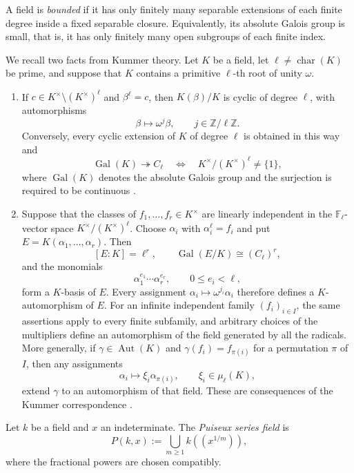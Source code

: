 \documentclass[10pt,a4paper]{amsart}
\renewcommand{\le}{\leqslant}
\renewcommand{\ge}{\geqslant}
\theoremstyle{definition}
\begin{document}
A field is \emph{bounded} if it has only finitely many
separable extensions of each finite degree inside a fixed
separable closure. Equivalently, its absolute Galois group
is small, that is, it has only finitely many open subgroups
of each finite index.

We recall two facts from Kummer theory. Let $K$ be a field,
let $\ell\ne\operatorname{char}(K)$ be prime, and suppose
that $K$ contains a primitive $\ell$-th root of unity $\omega$.

\begin{enumerate}[label=\textup{(\roman*)}]
\item
If $c\in K^\times\setminus(K^\times)^\ell$ and $\beta^\ell=c$,
then $K(\beta)/K$ is cyclic of degree $\ell$, with automorphisms
\[
\beta\longmapsto\omega^j\beta,
\qquad j\in\mathbb Z/\ell\mathbb Z.
\]
Conversely, every cyclic extension of $K$ of degree $\ell$
is obtained in this way and
\[
\operatorname{Gal}(K)\twoheadrightarrow C_\ell
\quad\Longleftrightarrow\quad
K^\times/(K^\times)^\ell\ne\{1\},
\]
where $\operatorname{Gal}(K)$ denotes the absolute Galois group
and the surjection is required to be continuous
\cite[Section~9.24, Tag~09I6]{Stacks}.

\item
Suppose that the classes of $f_1,\ldots,f_r\in K^\times$
are linearly independent in the $\mathbb F_\ell$-vector space
$K^\times/(K^\times)^\ell$. Choose $\alpha_i$ with
$\alpha_i^\ell=f_i$ and put $E=K(\alpha_1,\ldots,\alpha_r)$.
Then
\[
[E:K]=\ell^r,
\qquad
\operatorname{Gal}(E/K)\cong(C_\ell)^r,
\]
and the monomials
\[
\alpha_1^{e_1}\cdots\alpha_r^{e_r},
\qquad 0\le e_i<\ell,
\]
form a $K$-basis of $E$. Every assignment
$\alpha_i\mapsto\omega^{j_i}\alpha_i$ therefore defines
a $K$-automorphism of $E$. For an infinite independent family $(f_i)_{i\in I}$,
the same assertions apply to every finite subfamily, and arbitrary
choices of the multipliers define an automorphism of the field
generated by all the radicals. More generally, if
$\gamma\in\operatorname{Aut}(K)$ and
$\gamma(f_i)=f_{\pi(i)}$ for a permutation $\pi$ of $I$,
then any assignments
\[
\alpha_i\longmapsto\xi_i\alpha_{\pi(i)},
\qquad \xi_i\in\mu_\ell(K),
\]
extend $\gamma$ to an automorphism of that field.
These are consequences of the Kummer correspondence
\cite[Theorem~5.30 and Remark~5.32]{MilneFT}.
\end{enumerate}
Let $k$ be a field and $x$ an indeterminate. The
\emph{Puiseux series field} is
\[
P(k,x):=\bigcup_{m\ge1}k((x^{1/m})),
\]
where the fractional powers are chosen compatibly.
\end{document}

